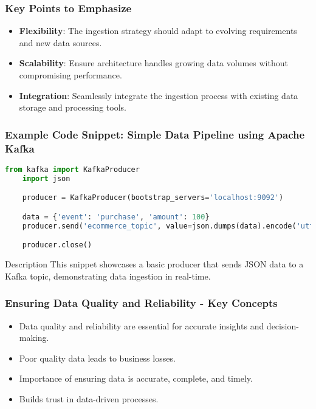 \documentclass{beamer}
\begin{document}
\begin{frame}[fragile]
    \frametitle{Key Points to Emphasize}
    \begin{itemize}
        \item \textbf{Flexibility}: The ingestion strategy should adapt to evolving requirements and new data sources.
        \item \textbf{Scalability}: Ensure architecture handles growing data volumes without compromising performance.
        \item \textbf{Integration}: Seamlessly integrate the ingestion process with existing data storage and processing tools.
    \end{itemize}
\end{frame}

\begin{frame}[fragile]
    \frametitle{Example Code Snippet: Simple Data Pipeline using Apache Kafka}
    \begin{lstlisting}[language=Python]
    from kafka import KafkaProducer
    import json

    producer = KafkaProducer(bootstrap_servers='localhost:9092')

    data = {'event': 'purchase', 'amount': 100}
    producer.send('ecommerce_topic', value=json.dumps(data).encode('utf-8'))

    producer.close()
    \end{lstlisting}
    \begin{block}{Description}
        This snippet showcases a basic producer that sends JSON data to a Kafka topic, demonstrating data ingestion in real-time.
    \end{block}
\end{frame}

\begin{frame}[fragile]
    \frametitle{Ensuring Data Quality and Reliability - Key Concepts}
    \begin{itemize}
        \item Data quality and reliability are essential for accurate insights and decision-making.
        \item Poor quality data leads to business losses.
        \item Importance of ensuring data is accurate, complete, and timely.
        \item Builds trust in data-driven processes.
    \end{itemize}
\end{frame}
\end{document}
